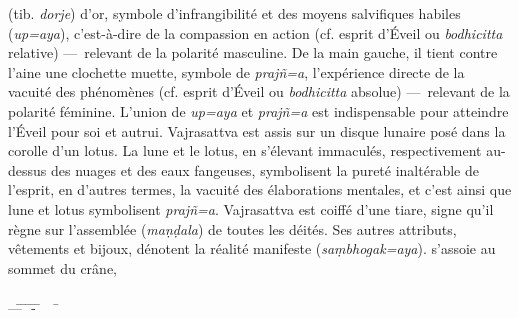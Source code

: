 \begin{tabbing}
{{    (tib. \emph{dorje}) d'or, symbole d'infrangibilité et des moyens
    salvifiques habiles (\emph{up\a={a}ya}), c'est-à-dire de la
    compassion en action (cf. esprit d'Éveil ou \emph{bodhicitta}
    relative) ---~relevant de la polarité masculine. De la main
    gauche, il tient contre l'aine une clochette muette, symbole de
    \emph{prajñ\a={a}}, l'expérience directe de la vacuité des
    phénomènes (cf. esprit d'Éveil ou \emph{bodhicitta} absolue)
    ---~relevant de la polarité féminine. L'union de \emph{up\a={a}ya}
    et \emph{prajñ\a={a}} est indispensable pour atteindre l'Éveil
    pour soi et autrui. Vajrasattva est assis sur un disque lunaire
    posé dans la corolle d'un lotus. La lune et le lotus, en s'élevant
    immaculés, respectivement au-dessus des nuages et des eaux
    fangeuses, symbolisent la pureté inaltérable de l'esprit, en
    d'autres termes, la vacuité des élaborations mentales, et c'est
    ainsi que lune et lotus symbolisent
    \emph{prajñ\a={a}}. Vajrasattva est coiffé d'une tiare, signe
    qu'il règne sur l'assemblée (\emph{ma\d{n}\d{d}ala}) de toutes les
    déités. Ses autres attributs, vêtements et bijoux, dénotent la
    réalité manifeste (\emph{sa\d{m}bhogak\a={a}ya}).}  s'assoie au
  sommet du crâne,}\\ \>\\ \>---\= \=
\=-\= \quad \=
\qquad\qquad\ \ \= \\ \> \>
\> \> \> \>
\>\\ \>
\end{tabbing}

\bigskip\bigskip


